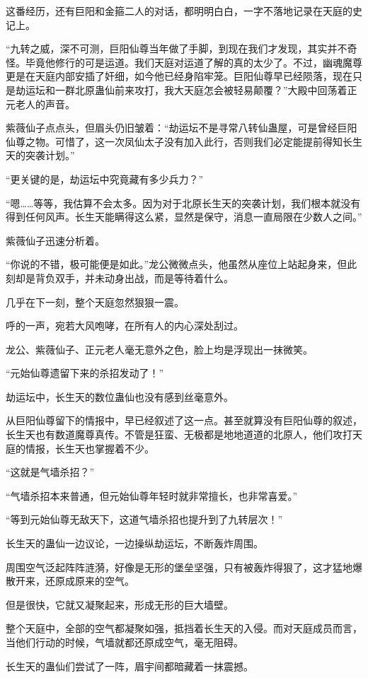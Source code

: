 \begin{this_body}
这番经历，还有巨阳和金箍二人的对话，都明明白白，一字不落地记录在天庭的史记上。

“九转之威，深不可测，巨阳仙尊当年做了手脚，到现在我们才发现，其实并不奇怪。毕竟他修行的可是运道。我们天庭对运道了解的真的太少了。不过，幽魂魔尊更是在天庭内部安插了奸细，如今他已经身陷牢笼。巨阳仙尊早已经陨落，现在只是劫运坛和一群北原蛊仙前来攻打，我大天庭怎会被轻易颠覆？”大殿中回荡着正元老人的声音。

紫薇仙子点点头，但眉头仍旧皱着：“劫运坛不是寻常八转仙蛊屋，可是曾经巨阳仙尊之物。可惜了，这一次凤仙太子没有加入此行，否则我们必定能提前得知长生天的突袭计划。”

“更关键的是，劫运坛中究竟藏有多少兵力？”

“嗯……等等，我估算不会太多。因为对于北原长生天的突袭计划，我们根本就没有得到任何风声。长生天能瞒得这么紧，显然是保守，消息一直局限在少数人之间。”

紫薇仙子迅速分析着。

“你说的不错，极可能便是如此。”龙公微微点头，他虽然从座位上站起身来，但此刻却是背负双手，并未动身出战，而是等待着什么。

几乎在下一刻，整个天庭忽然狠狠一震。

呼的一声，宛若大风咆哮，在所有人的内心深处刮过。

龙公、紫薇仙子、正元老人毫无意外之色，脸上均是浮现出一抹微笑。

“元始仙尊遗留下来的杀招发动了！”

劫运坛中，长生天的数位蛊仙也没有感到丝毫意外。

从巨阳仙尊留下的情报中，早已经叙述了这一点。甚至就算没有巨阳仙尊的叙述，长生天也有数道魔尊真传。不管是狂蛮、无极都是地地道道的北原人，他们攻打天庭的情报，长生天也掌握着不少。

“这就是气墙杀招？”

“气墙杀招本来普通，但元始仙尊年轻时就非常擅长，也非常喜爱。”

“等到元始仙尊无敌天下，这道气墙杀招也提升到了九转层次！”

长生天的蛊仙一边议论，一边操纵劫运坛，不断轰炸周围。

周围空气泛起阵阵涟漪，好像是无形的堡垒坚强，只有被轰炸得狠了，这才猛地爆散开来，还原成原来的空气。

但是很快，它就又凝聚起来，形成无形的巨大墙壁。

整个天庭中，全部的空气都凝聚如强，抵挡着长生天的入侵。而对天庭成员而言，当他们行动的时候，气墙就都还原成空气，毫无阻碍。

长生天的蛊仙们尝试了一阵，眉宇间都暗藏着一抹震撼。


\end{this_body}
